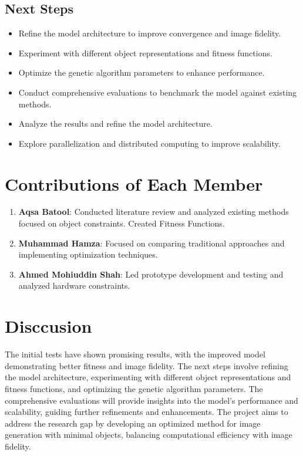 \documentclass[10pt, conference]{IEEEtran}
\begin{document}
\subsection*{
	Next Steps
}
\begin{itemize}
	\item Refine the model architecture to improve convergence and image fidelity.
	\item Experiment with different object representations and fitness functions.
	\item Optimize the genetic algorithm parameters to enhance performance.
	\item Conduct comprehensive evaluations to benchmark the model against existing methods.
	\item Analyze the results and refine the model architecture.
	\item Explore parallelization and distributed computing to improve scalability.
\end{itemize}



\section{Contributions of Each Member}

\begin{enumerate}[label=\arabic*)]
	\item \textbf{Aqsa Batool}: Conducted literature review and analyzed existing methods focused on object constraints. Created Fitness Functions.
	\item \textbf{Muhammad Hamza}: Focused on comparing traditional approaches and implementing optimization techniques.
	\item \textbf{Ahmed Mohiuddin Shah}: Led prototype development and testing and analyzed hardware constraints.
\end{enumerate}

\section{Disccusion}
The initial tests have shown promising results, with the improved model demonstrating better fitness and image fidelity. The next steps involve refining the model architecture, experimenting with different object representations and fitness functions, and optimizing the genetic algorithm parameters. The comprehensive evaluations will provide insights into the model's performance and scalability, guiding further refinements and enhancements. The project aims to address the research gap by developing an optimized method for image generation with minimal objects, balancing computational efficiency with image fidelity.
\end{document}
